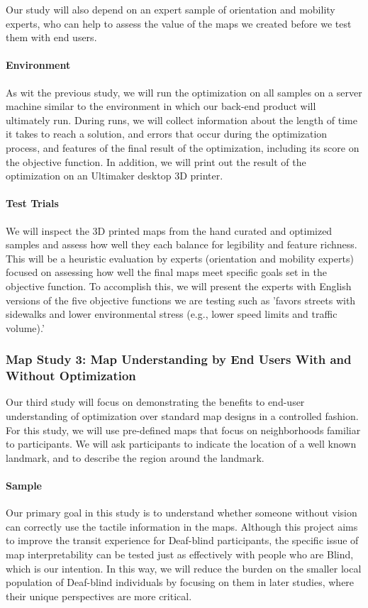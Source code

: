Our study will also depend on an expert sample of orientation and mobility experts, who can help to assess the value of the maps we created before we test them with end users. 

\paragraph{Environment}
As wit the previous study, we will run the optimization on all samples on a server machine similar to the environment in which our back-end product will ultimately run. During runs, we will collect information about the length of time it takes to reach a solution, and errors that occur during the optimization process, and features of the final result of the optimization, including its score on the objective function. In addition, we will print out the result of the optimization on an Ultimaker desktop 3D printer.

\paragraph{Test Trials}
We will inspect the 3D printed maps from the hand curated and optimized samples and assess how well they each balance for legibility and feature richness. This will be a heuristic evaluation by experts (orientation and mobility experts) focused on assessing how well the final maps meet specific goals set in the objective function. To accomplish this, we will present the experts with English versions of the five objective functions we are testing such as 'favors streets with sidewalks and lower environmental stress (e.g., lower speed limits and traffic volume).' 

\subsubsection{Map Study 3: Map Understanding by End Users With and Without Optimization}
\label{sec:lab-tests}
Our third study will focus on demonstrating the benefits to end-user understanding of optimization over standard map designs in a controlled fashion. For this study, we will use pre-defined maps that focus on neighborhoods familiar to participants. We will ask participants to indicate the location of a well known landmark, and to describe the region around the landmark. 

\paragraph{Sample}
Our primary goal in this study is to understand whether someone without vision can correctly use the tactile information in the maps. Although this project aims to improve the transit experience for Deaf-blind participants, the specific issue of map interpretability can be tested just as effectively with people who are Blind, which is our intention. In this way, we will reduce the burden on the smaller local population of Deaf-blind individuals by focusing on them in later studies, where their unique perspectives are more critical.

